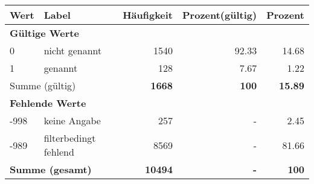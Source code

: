      \begin{longtable}{lXrrr}
     \toprule
     \textbf{Wert} & \textbf{Label} & \textbf{Häufigkeit} & \textbf{Prozent(gültig)} & \textbf{Prozent} \\
     \endhead
     \midrule
     \multicolumn{5}{l}{\textbf{Gültige Werte}}\\

     0 &
     \multicolumn{1}{X}{ nicht genannt   } &


       \num{1540} &
       \num[round-mode=places,round-precision=2]{92,33} &
         \num[round-mode=places,round-precision=2]{14,68} \\

     1 &
     \multicolumn{1}{X}{ genannt   } &


       \num{128} &
       \num[round-mode=places,round-precision=2]{7,67} &
         \num[round-mode=places,round-precision=2]{1,22} \\
     \midrule
     \multicolumn{2}{l}{Summe (gültig)} &
       \textbf{\num{1668}} &
     \textbf{100} &
       \textbf{\num[round-mode=places,round-precision=2]{15,89}} \\
     \multicolumn{5}{l}{\textbf{Fehlende Werte}}\\
       -998 &
       keine Angabe &
         \num{257} &
        - &
         \num[round-mode=places,round-precision=2]{2,45} \\
       -989 &
       filterbedingt fehlend &
         \num{8569} &
        - &
         \num[round-mode=places,round-precision=2]{81,66} \\
     \midrule
     \multicolumn{2}{l}{\textbf{Summe (gesamt)}} &
          \textbf{\num{10494}} &
        \textbf{-} &
        \textbf{100} \\
     \bottomrule
     \end{longtable}
     
